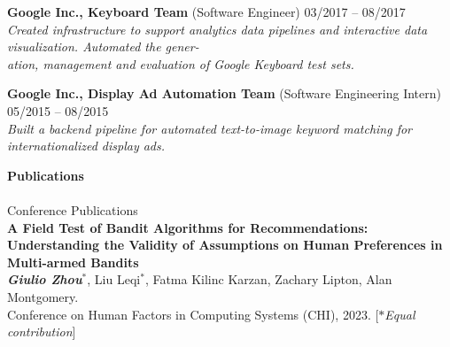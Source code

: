 \documentclass{article}
\begin{document}
\noindent
\textbf{Google Inc., Keyboard Team} (Software Engineer)
\hfill 03/2017 -- 08/2017\\
\indent
\hspace{-2.5mm}
\textit{Created infrastructure to support analytics data pipelines and interactive data visualization. Automated the gener-}\\
\indent
\hspace{-2.5mm}
\textit{ation, management and evaluation of Google Keyboard test sets.}
\vspace{0.5mm}

\noindent
\textbf{Google Inc., Display Ad Automation Team} (Software Engineering Intern)
\hfill 05/2015 -- 08/2015\\
\indent
\hspace{-2.5mm}
\textit{Built a backend pipeline for automated text-to-image keyword matching for internationalized display ads.}
\vspace{5mm}


\noindent
\textbf{\Large Publications}\\[-2mm]
\HRule\\
{\large Conference Publications}\vspace{-3.5mm}\\

\setlength{\leftskip}{2mm}
\noindent
\textbf{A Field Test of Bandit Algorithms for Recommendations: Understanding the Validity of Assumptions on Human Preferences in Multi-armed Bandits} \\
\indent
\hspace{-4.5mm}
{\small \textit{\textbf{Giulio Zhou$^*$}}, Liu Leqi$^*$, Fatma Kilinc Karzan, Zachary Lipton, Alan Montgomery.} \\
\indent
\hspace{-4.1mm}
{\small Conference on Human Factors in Computing Systems (CHI), 2023. \hspace{-1mm} \footnotesize [\textit{$*$Equal contribution}]} \\
\vspace{-3mm}
\end{document}
